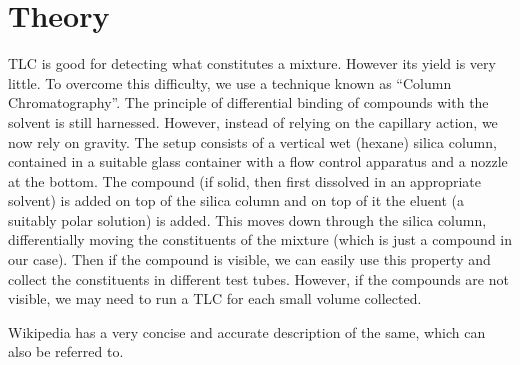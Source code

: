 \section{Theory}
	TLC is good for detecting what constitutes a mixture. However its yield is very little. To overcome this difficulty, we use a technique known as ``Column Chromatography''. The principle of differential binding of compounds with the solvent is still harnessed. However, instead of relying on the capillary action, we now rely on gravity. The setup consists of a vertical wet (hexane) silica column, contained in a suitable glass container with a flow control apparatus and a nozzle at the bottom. The compound (if solid, then first dissolved in an appropriate solvent) is added on top of the silica column and on top of it the eluent (a suitably polar solution) is added. This moves down through the silica column, differentially moving the constituents of the mixture (which is just a compound in our case). Then if the compound is visible, we can easily use this property and collect the constituents in different test tubes. However, if the compounds are not visible, we may need to run a TLC for each small volume collected.
	\par
	Wikipedia has a very concise and accurate description of the same, which can also be referred to.


